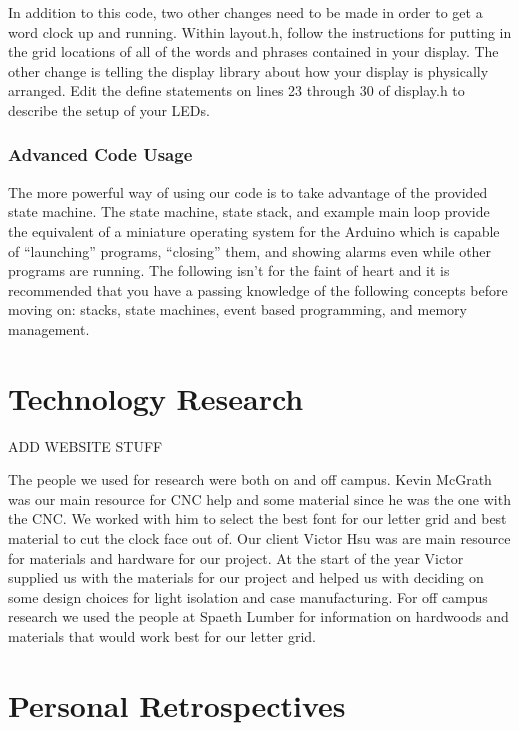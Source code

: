 \documentclass[onecolumn, draftclsnofoot,10pt, compsoc]{IEEEtran}
\begin{document}
In addition to this code, two other changes need to be made in order to get a word clock up and running.
Within layout.h, follow the instructions for putting in the grid locations of all of the words and phrases contained in your display.
The other change is telling the display library about how your display is physically arranged.
Edit the define statements on lines 23 through 30 of display.h to describe the setup of your LEDs.

\subsubsection{Advanced Code Usage}
The more powerful way of using our code is to take advantage of the provided state machine.
The state machine, state stack, and example main loop provide the equivalent of a miniature operating system for the Arduino which is capable of ``launching'' programs, ``closing'' them, and showing alarms even while other programs are running.
The following isn’t for the faint of heart and it is recommended that you have a passing knowledge of the following concepts before moving on: stacks, state machines, event based programming, and memory management.







\section{Technology Research}
ADD WEBSITE STUFF

The people we used for research were both on and off campus.
Kevin McGrath was our main resource for CNC help and some material since he was the one with the CNC.
We worked with him to select the best font for our letter grid and best material to cut the clock face out of.
Our client Victor Hsu was are main resource for materials and hardware for our project.
At the start of the year Victor supplied us with the materials for our project and helped us with deciding on some design choices for light isolation and case manufacturing.
For off campus research we used the people at Spaeth Lumber for information on hardwoods and materials that would work best for our letter grid.

\section{Personal Retrospectives}
\end{document}
